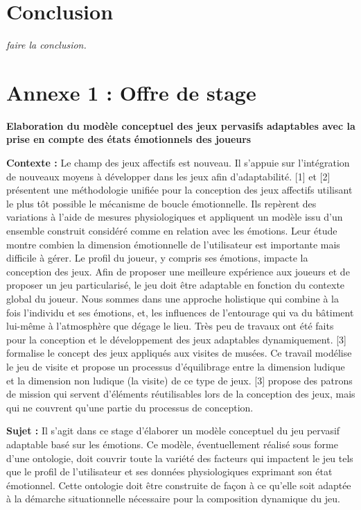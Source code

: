 \documentclass{article}
\begin{document}
\section{Conclusion}
	\textit{faire la conclusion.}


\newpage
\appendix
\section{Annexe 1 : Offre de stage}\label{app:annexe1}
	\textbf{Elaboration du modèle conceptuel des jeux pervasifs adaptables avec la prise en compte des états émotionnels des joueurs}\par
	\medskip
	\textbf{Contexte :}\newline
	Le champ des jeux affectifs est nouveau. Il s’appuie sur l’intégration de nouveaux moyens à développer dans les jeux afin d’adaptabilité. [1] et [2] présentent une méthodologie unifiée pour la conception des jeux affectifs utilisant le plus tôt possible le mécanisme de boucle émotionnelle. Ils repèrent des variations à l’aide de mesures physiologiques et appliquent un modèle issu d’un ensemble construit considéré comme en relation avec les émotions. Leur étude montre combien la dimension émotionnelle de l’utilisateur est importante mais difficile à gérer.\newline
	Le profil du joueur, y compris ses émotions, impacte la conception des jeux. Afin de proposer une meilleure expérience aux joueurs et de proposer un jeu particularisé, le jeu doit être adaptable en fonction du contexte global du joueur. Nous sommes dans une approche holistique qui combine à la fois l’individu et ses émotions, et, les influences de l’entourage qui va du bâtiment lui-même à l’atmosphère que dégage le lieu. Très peu de travaux ont été faits pour la conception et le développement des jeux adaptables dynamiquement. [3] formalise le concept des jeux appliqués aux visites de musées. Ce travail modélise le jeu de visite et propose un processus d’équilibrage entre la dimension ludique et la dimension non ludique (la visite) de ce type de jeux. [3] propose des patrons de mission qui servent d’éléments réutilisables lors de la conception des jeux, mais qui ne couvrent qu’une partie du processus de conception.\par
	\textbf{Sujet :}\newline
	Il s’agit dans ce stage d’élaborer un modèle conceptuel du jeu pervasif adaptable basé sur les émotions. Ce modèle, éventuellement réalisé sous forme d’une ontologie, doit couvrir toute la variété des facteurs qui impactent le jeu tels que le profil de l’utilisateur et ses données physiologiques exprimant son état émotionnel. Cette ontologie doit être construite de façon à ce qu’elle soit adaptée à la démarche situationnelle nécessaire pour la composition dynamique du jeu.
\end{document}
